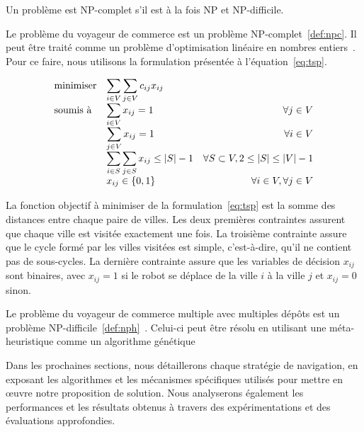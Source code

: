 \documentclass[francais,RandD]{rapportPFE}
\begin{document}
				\begin{Definition}
					\label{def:npc}
					Un problème est NP-complet s'il est à la fois NP et NP-difficile.
				\end{Definition}

				Le problème du voyageur de commerce est un problème NP-complet~\ref{def:npc}.
				Il peut être traité comme un problème d'optimisation linéaire en nombres entiers~\cite{article244, gurobi25}.
				Pour ce faire, nous utilisons la formulation présentée à l'équation~\ref{eq:tsp}.

				\begin{equation}
					\label{eq:tsp}
					\begin{array}{ll@{}rr}
						\text{minimiser} &
						\displaystyle\sum\limits_{i \in V} \sum\limits_{j \in V} c_{ij} x_{ij} &
						&
						\\
						\text{soumis à} &
						\displaystyle\sum\limits_{i \in V} x_{ij} = 1 &
						&
						\forall j \in V \\
						&
						\displaystyle\sum\limits_{j \in V} x_{ij} = 1 &
						&
						\forall i \in V \\
						&
						\displaystyle\sum\limits_{i \in S} \sum\limits_{j \in S} x_{ij} \leq |S| - 1 &
						&
						\forall S \subset V, 2 \leq |S| \leq |V| - 1 \\
						&
						x_{ij} \in \{0, 1\} &
						&
						\forall i \in V, \forall j \in V \\
					\end{array}
				\end{equation}

				La fonction objectif à minimiser de la formulation~\ref{eq:tsp} est la somme des distances entre chaque paire de villes.
				Les deux premières contraintes assurent que chaque ville est visitée exactement une fois.
				La troisième contrainte assure que le cycle formé par les villes visitées est simple, c'est-à-dire, qu'il ne contient pas de sous-cycles.
				La dernière contrainte assure que les variables de décision $x_{ij}$ sont binaires, avec $x_{ij} = 1$ si le robot se déplace de la ville $i$ à la ville $j$ et $x_{ij} = 0$ sinon.

				Le problème du voyageur de commerce multiple avec multiples dépôts est un problème NP-difficile~\ref{def:nph}~\cite{SUNDAR201639}.
				Celui-ci peut être résolu en utilisant une méta-heuristique comme un algorithme génétique~\cite{SinghMTSP, Kiraly2011}

				Dans les prochaines sections, nous détaillerons chaque stratégie de navigation, en exposant les algorithmes et les mécanismes spécifiques utilisés pour mettre en œuvre notre proposition de solution. Nous analyserons également les performances et les résultats obtenus à travers des expérimentations et des évaluations approfondies.
\end{document}
